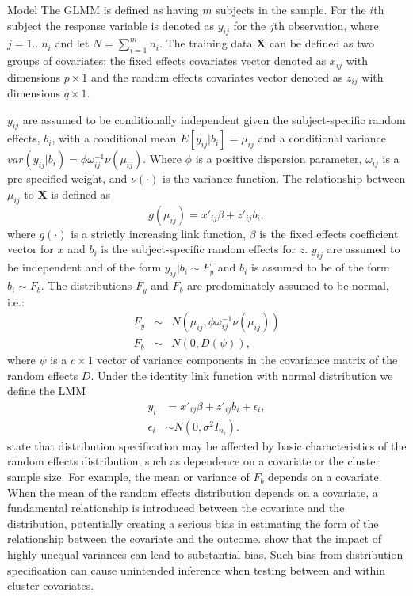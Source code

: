 \documentclass{article}
\begin{document}
\begin{subsection}{Model} \label{jrange}
    The GLMM is defined as having $m$ subjects in the sample. For the $i$th subject the response variable is denoted as $y_{ij}$ for the $j$th observation, where $j=1 \dots n_i$ and let $N=\sum_{i=1}^{m}n_i$. The training data \textbf{X} can be defined as two groups of covariates: the fixed effects covariates vector denoted as $x_{ij}$ with dimensions $p\times 1$ and the random effects covariates vector denoted as $z_{ij}$ with dimensions $q\times 1$.

    $y_{ij}$ are assumed to be conditionally independent given the subject-specific random effects, $b_i$, with a conditional mean $E[y_{ij}|b_i]=\mu_{ij}$ and a conditional variance $var(y_{ij}|b_i)=\phi\omega^{-1}_{ij}\nu(\mu_{ij})$. Where $\phi$ is a positive dispersion parameter, $\omega_{ij}$ is a pre-specified weight, and $\nu(\cdot)$ is the variance function. The relationship between $\mu_{ij}$ to \textbf{X} is defined as
%		
		\begin{equation*}
		g(\mu_{ij})=x'_{ij}\beta+z'_{ij}b_i,
		\end{equation*}
%		
		where $g(\cdot)$ is a strictly increasing link function, $\beta$ is the fixed effects coefficient vector for $x$ and $b_i$ is the subject-specific random effects for $z$. $y_{ij}$ are assumed to be independent and of the form $y_{ij}|b_i\sim F_y$ and $b_i$ is assumed to be of the form $b_i\sim F_b$. The distributions  $F_y$ and $F_b$ are predominately assumed to be normal, i.e.:
%
		\begin{eqnarray*}
				F_y&\sim& N(\mu_{ij},\phi\omega^{-1}_{ij}\nu(\mu_{ij}))\\
				F_b&\sim& N(0,D(\psi)),
		\end{eqnarray*}
%
where $\psi$ is a $c \times 1$ vector of variance components in the covariance matrix of the random effects $D$. Under the identity link function with normal distribution we define the LMM
%
		\begin{equation}
		\label{eq:LMM}
		\begin{split}
		y_i&=x'_{ij}\beta+z'_{ij}b_i+\epsilon_i,\\
		\epsilon_i&\sim N(0,\sigma^2I_{n_i}).
		\end{split}
		\end{equation}
%		
\cite{McCullochNeuhaus2011} state that distribution specification may be affected by basic characteristics of the random effects distribution, such as dependence on a covariate or the cluster sample size.
For example, the mean or variance of $F_b$ depends on a covariate. When the mean of the random effects distribution depends on a covariate, a fundamental relationship is
introduced between the covariate and the distribution, potentially creating a serious bias in estimating the form of the relationship between the covariate and the outcome. \cite{heagerty2001misspecified} show that the impact of highly unequal variances can lead to substantial bias. Such bias from distribution specification can cause unintended inference when testing between and within cluster covariates.
\end{subsection}
\end{document}
